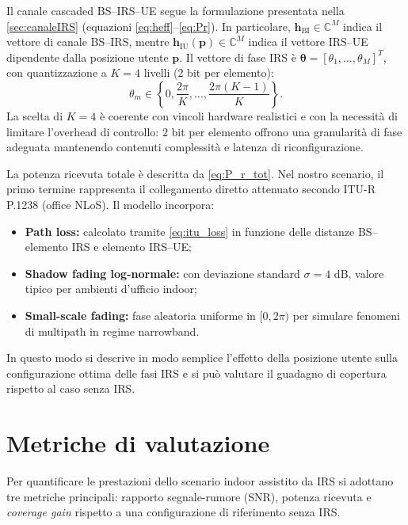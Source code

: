 \documentclass[12pt,a4paper]{report}
\begin{document}
Il canale cascaded BS--IRS--UE segue la formulazione presentata nella
\cref{sec:canaleIRS} (equazioni \eqref{eq:heff}--\eqref{eq:Pr}). In
particolare, $\mathbf{h}_{\text{BI}} \in \mathbb{C}^{M}$ indica il
vettore di canale BS--IRS, mentre
$\mathbf{h}_{\text{IU}}(\mathbf{p}) \in \mathbb{C}^{M}$ indica il
vettore IRS--UE dipendente dalla posizione utente $\mathbf{p}$. Il
vettore di fase IRS è
$\boldsymbol{\theta} = [\theta_1, \dots, \theta_M]^T$, con
quantizzazione a $K=4$ livelli (2 bit per elemento):
\begin{equation}
  \theta_m \in \left\{0, \frac{2\pi}{K}, \dots, \frac{2\pi(K-1)}{K}\right\}.
  \label{eq:theta_quantized}
\end{equation}
La scelta di $K=4$ è coerente con vincoli hardware realistici e con
la necessità di limitare l'overhead di controllo: 2 bit per elemento
offrono una granularità di fase adeguata mantenendo contenuti
complessità e latenza di riconfigurazione.

La potenza ricevuta totale è descritta da \eqref{eq:P_r_tot}. Nel
nostro scenario, il primo termine rappresenta il collegamento diretto
attenuato secondo ITU-R P.1238 (office NLoS).
Il modello incorpora:
\begin{itemize}
  \item \textbf{Path loss:} calcolato tramite \eqref{eq:itu_loss} in
    funzione delle distanze BS--elemento IRS e elemento IRS--UE;
  \item \textbf{Shadow fading log-normale:} con deviazione standard
    $\sigma = 4$ dB, valore tipico per ambienti d'ufficio indoor;
  \item \textbf{Small-scale fading:} fase aleatoria uniforme in
    $[0, 2\pi)$ per simulare fenomeni di multipath in regime narrowband.
\end{itemize}

In questo modo si descrive in modo semplice l'effetto della posizione
utente sulla configurazione ottima delle fasi IRS e si può valutare il
guadagno di copertura rispetto al caso senza IRS.

\newpage
\section{Metriche di valutazione}
Per quantificare le prestazioni dello scenario indoor assistito da
IRS si adottano tre metriche principali: rapporto segnale-rumore
(SNR), potenza ricevuta e \textit{coverage gain} rispetto a una
configurazione di riferimento senza IRS.
\end{document}
